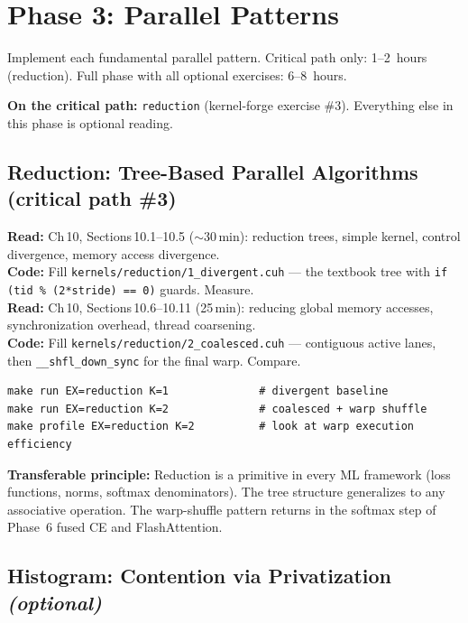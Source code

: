 \documentclass[11pt, letterpaper]{article}
\begin{document}
\section{Phase 3: Parallel Patterns}

\begin{phasebox}[Goal]
Implement each fundamental parallel pattern. Critical path only: 1--2~hours (reduction). Full phase with all optional exercises: 6--8~hours.
\end{phasebox}

\textbf{On the critical path:} \texttt{reduction} (kernel-forge exercise \#3). Everything else in this phase is optional reading.

\subsection{Reduction: Tree-Based Parallel Algorithms (critical path \#3)}

\textbf{Read:} Ch\,10, Sections\,10.1--10.5 ($\sim$30\,min): reduction trees, simple kernel, control divergence, memory access divergence.\\
\textbf{Code:} Fill \texttt{kernels/reduction/1\_divergent.cuh} --- the textbook tree with \texttt{if (tid \% (2*stride) == 0)} guards. Measure.\\
\textbf{Read:} Ch\,10, Sections\,10.6--10.11 (25\,min): reducing global memory accesses, synchronization overhead, thread coarsening.\\
\textbf{Code:} Fill \texttt{kernels/reduction/2\_coalesced.cuh} --- contiguous active lanes, then \texttt{\_\_shfl\_down\_sync} for the final warp. Compare.

\begin{verbatim}
make run EX=reduction K=1              # divergent baseline
make run EX=reduction K=2              # coalesced + warp shuffle
make profile EX=reduction K=2          # look at warp execution efficiency
\end{verbatim}

\textbf{Transferable principle:} Reduction is a primitive in every ML framework (loss functions, norms, softmax denominators). The tree structure generalizes to any associative operation. The warp-shuffle pattern returns in the softmax step of Phase~6 fused CE and FlashAttention.

\subsection{Histogram: Contention via Privatization \emph{(optional)}}
\end{document}
